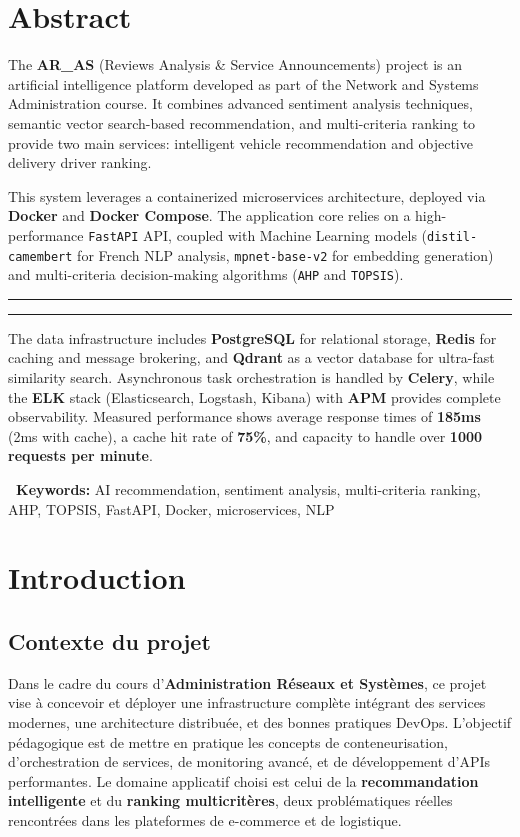 \documentclass[11pt,a4paper]{report}
\newcommand{\concept}[1]{\textcolor{arasPrimary}{\textbf{#1}}}
\newcommand{\tech}[1]{\texttt{\textcolor{arasDark}{#1}}}
\newcommand{\elegantsep}{\begin{center}\vspace{10pt}\textcolor{arasGray300}{\rule{0.2\textwidth}{0.5pt}\hspace{10pt}\textcolor{arasAccent}{\faStar}\hspace{10pt}\rule{0.2\textwidth}{0.5pt}}\vspace{10pt}\end{center}}
\begin{document}
\chapter*{Abstract}
\begin{infobox}
The \concept{AR\_AS} (Reviews Analysis \& Service Announcements) project is an artificial intelligence platform developed as part of the Network and Systems Administration course. It combines advanced sentiment analysis techniques, semantic vector search-based recommendation, and multi-criteria ranking to provide two main services: intelligent vehicle recommendation and objective delivery driver ranking.
\end{infobox}
\vspace{0.5cm}
This system leverages a containerized microservices architecture, deployed via \concept{Docker} and \concept{Docker Compose}. The application core relies on a high-performance \tech{FastAPI} API, coupled with Machine Learning models (\tech{distil-camembert} for French NLP analysis, \tech{mpnet-base-v2} for embedding generation) and multi-criteria decision-making algorithms (\tech{AHP} and \tech{TOPSIS}).
\elegantsep
The data infrastructure includes \concept{PostgreSQL} for relational storage, \concept{Redis} for caching and message brokering, and \concept{Qdrant} as a vector database for ultra-fast similarity search. Asynchronous task orchestration is handled by \concept{Celery}, while the \concept{ELK} stack (Elasticsearch, Logstash, Kibana) with \concept{APM} provides complete observability.
Measured performance shows average response times of \textbf{185ms} (2ms with cache), a cache hit rate of \textbf{75\%}, and capacity to handle over \textbf{1000 requests per minute}.
\begin{processbox}
\textbf{\textcolor{arasPrimary}{\faTags\ Keywords:}} AI recommendation, sentiment analysis, multi-criteria ranking, AHP, TOPSIS, FastAPI, Docker, microservices, NLP
\end{processbox}
\newpage
\tableofcontents
\newpage
\listoffigures
\newpage
\listoftables
\chapter*{Introduction}
\section*{Contexte du projet}
Dans le cadre du cours d'\concept{Administration Réseaux et Systèmes}, ce projet vise à concevoir et déployer une infrastructure complète intégrant des services modernes, une architecture distribuée, et des bonnes pratiques DevOps. L'objectif pédagogique est de mettre en pratique les concepts de conteneurisation, d'orchestration de services, de monitoring avancé, et de développement d'APIs performantes.
Le domaine applicatif choisi est celui de la \concept{recommandation intelligente} et du \concept{ranking multicritères}, deux problématiques réelles rencontrées dans les plateformes de e-commerce et de logistique.
\end{document}
